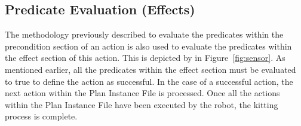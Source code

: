 \subsection{Predicate Evaluation (Effects)}
The methodology previously described to evaluate the predicates within the precondition section of an action is also used to evaluate the predicates within the effect section of this action. This is depicted by  in Figure~\ref{fig:sensor}. As mentioned earlier, all the predicates within the effect section must be evaluated to true to define the action as successful. In the case of a successful action, the next action within the \textsf{Plan Instance File} is processed. Once all the actions within the \textsf{Plan Instance File} have been executed by the robot, the kitting process is complete.
